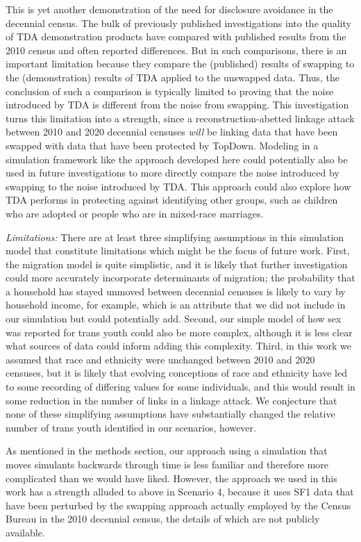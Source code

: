 \documentclass{jpc} %
\theoremstyle{plain}\newtheorem{satz}[thm]{Satz} %
\begin{document}
This is yet another demonstration of the need for disclosure avoidance in the decennial census.  The bulk of previously published investigations into the quality of TDA demonstration products have compared with published results from the 2010 census and often reported differences.  But in such comparisons, there is an important limitation because they compare the (published) results of swapping to the (demonstration) results of TDA applied to the unswapped data.  Thus, the conclusion of such a comparison is typically limited to proving that the noise introduced by TDA is different from the noise from swapping.
This investigation turns this limitation into a strength, since a reconstruction-abetted linkage attack between 2010 and 2020 decennial censuses \emph{will} be linking data that have been swapped with data that have been protected by TopDown.
Modeling in a simulation framework like the approach developed here could potentially also be used in future investigations to more directly compare the noise introduced by swapping to the noise introduced by TDA.  This approach could also explore how TDA performs in protecting against identifying other groups, such as children who are adopted or people who are in mixed-race marriages.

\emph{Limitations:}
There are at least three simplifying assumptions in this simulation model that constitute limitations which might be the focus of future work.  First, the migration model is quite simplistic, and it is likely that further investigation could more accurately incorporate determinants of migration; the probability that a household has stayed unmoved between decennial censuses is likely to vary by household income, for example, which is an attribute that we did not include in our simulation but could potentially add.
Second, our simple model of how sex was reported for trans youth could also be more complex, although it is less clear what sources of data could inform adding this complexity. Third, in this work we assumed that race and ethnicity were unchanged between 2010 and 2020 censuses, but it is likely that evolving conceptions of race and ethnicity have led to some recording of differing values for some individuals, and this would result in some reduction in the number of links in a linkage attack.  We conjecture that none of these simplifying assumptions have substantially changed the relative number of trans youth identified in our scenarios, however.

As mentioned in the methods section, our approach using a simulation that moves simulants backwards through time is less familiar and therefore more complicated than we would have liked.  However, the approach we used in this work has a strength alluded to above in Scenario 4, because it uses SF1 data that have been perturbed by the swapping approach actually employed by the Census Bureau in the 2010 decennial census, the details of which are not publicly available.
\end{document}
